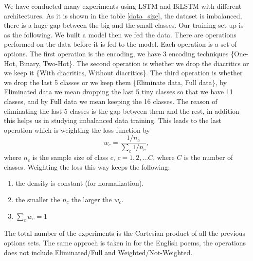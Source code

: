 \documentclass[12pt]{report}
\begin{document}
We have conducted many experiments using LSTM and BiLSTM with
different architectures. As it is shown in the table \ref{data_size}, the dataset
is imbalanced, there is a huge gap between the big and the small classes.
Our training set-up is as the following. We built a model then
we fed the data.  There are operations performed on the data before it is fed to
the model.  Each operation is a set of options. The first operation is the
encoding, we have 3 encoding techniques \{One-Hot, Binary, Two-Hot\}. The
second operation is whether we drop the diacritics or we keep it \{With
diacritics, Without diacritics\}. The third operation is whether we drop the
last 5 classes or we keep them \{Eliminate data, Full data\}, by
Eliminated data we mean dropping the last 5 tiny classes so that we have 11
classes, and by Full data we mean keeping the 16 classes.
The reason of eliminating the last 5 classes is the gap between them and the
rest, in addition this helps us in studying imbalanced data training. This
leads to the last operation which is weighting the loss function by%
\[w_c = \frac{1/n_c}{\sum\limits_{c}1/n_c},\]%
where $n_c$ is the sample size of class $c$, $c = 1, 2, ... C$, where $C$ is the number of classes.  Weighting the loss this way keeps the following:
\begin{enumerate}
  \item the density is constant (for normalization).
  \item the smaller the $n_c$ the larger the $w_c$.
  \item $\sum\limits_{c} w_c = 1$
\end{enumerate}
The total number of the experiments is the Cartesian product of all the previous
options sets. The same approch is taken in for the English poems, the operations
does not include Eliminated/Full and Weighted/Not-Weighted.























\end{document}
